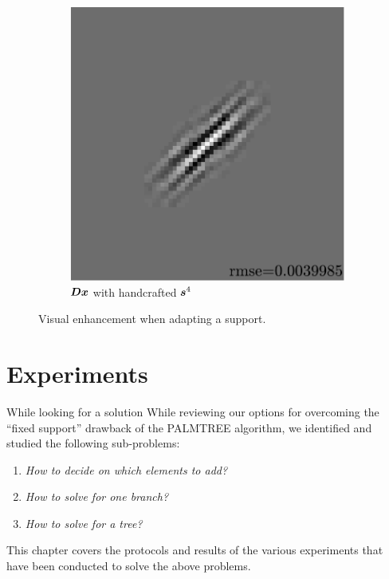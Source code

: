 \begin{figure}[!ht]
\begin{subfigure}[b]{0.085\textwidth}
	\caption{}
\end{subfigure}
\begin{subfigure}[b]{0.39\textwidth}\centering
	\includegraphics[width=\textwidth]{figures/exple-better-support/xp_128x128_sc2_angl1_K3_S3_node4expected_approx.pdf}
	\caption{$\bm{D}\bm{x}$ with handcrafted $\bm{s}^4$}\label{fig_xp_fixed_vs_expected_approx2}
\end{subfigure}
\caption{Visual enhancement when adapting a support.}\label{fig_xp_fixed_vs_expected}
\end{figure}




\chapter{Experiments}

While looking for a solution 
While reviewing our options for overcoming the “fixed support” drawback of the PALMTREE algorithm, we identified and studied the following sub-problems:
\begin{enumerate}[label=--,noitemsep]
	\item \emph{How to decide on which elements to add?} 
	\item \emph{How to solve for one branch?}
	\item \emph{How to solve for a tree?}
\end{enumerate}
This chapter covers the protocols and results of the various experiments that have been conducted to solve the above problems.

